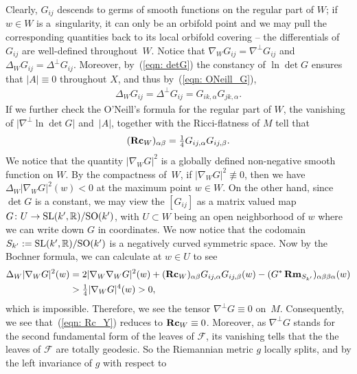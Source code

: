 \documentclass[pdftex]{sigma}
\numberwithin{equation}{section}
\newcommand{\Rm}{\operatorname{\bf Rm}}
\newcommand{\Rc}{\operatorname{\bf Rc}}
\begin{document}
Clearly, $G_{ij}$ descends to germs of smooth functions on the regular part of
$W$; if $w\in W$ is a~singularity, it can only be an orbifold point and we may
pull the corresponding quantities back to its local orbifold covering -- the
differentials of $G_{ij}$ are well-defined throughout~$W$. Notice that
$\nabla_W G_{ij}= \nabla^{\perp}G_{ij}$ and $\Delta_W G_{ij}=
\Delta^{\perp}G_{ij}$. Moreover, by~(\ref{eqn: detG}) the constancy of $\ln
\det G$ ensures that $|A|\equiv 0$ throughout $X$, and thus by~(\ref{eqn:
ONeill_G}),
\begin{align*}%
\Delta_W G_{ij} = \Delta^{\perp}G_{ij} = G_{ik,\alpha}G_{jk,\alpha}.
\end{align*}
If we further check the O'Neill's formula for the regular part of $W$, the
vanishing of $\big|\nabla^{\perp}\ln \det G\big|$ and~$|A|$, together with
the Ricci-flatness of $M$ tell that
\begin{align}\label{eqn: Rc_Y}
 (\Rc_W )_{\alpha\beta} = \tfrac{1}{4}G_{ij,\alpha}G_{ij,\beta}.
 \end{align}
We notice that the quantity $|\nabla_W G|^2$ is a globally defined non-negative
smooth function on $W$. By the compactness of~$W$, if
$\left|\nabla_W G\right|^2\not\equiv 0$, then we have $\Delta_W |\nabla_W
G |^2(w)<0$ at the maximum point $w\in W$. On the other hand, since $\det
G$ is a constant, we may view the $ [G_{ij} ]$ as a matrix valued map $G\colon
U \to {\rm SL}(k',\mathbb{R}) \slash {\rm SO}(k')$, with $U\subset W$ being an open
 neighborhood of $w$ where we can write down $G$ in coordinates. We now notice
 that the codomain $S_{k'}:={\rm SL}(k',\mathbb{R}) \slash {\rm SO}(k')$ is a negatively
 curved symmetric space. Now by the Bochner formula, we can calculate at $w\in
 U$ to see
 \begin{align*}
\Delta_W |\nabla_W G |^2(w)& =
2 |\nabla_W\nabla_W G |^2(w)+
 (\Rc_W )_{\alpha\beta}G_{ij,\alpha}G_{ij,\beta}(w)
- (G^{\ast}\Rm_{S_{k'}} )_{\alpha\beta\beta\alpha}(w)\\
 & >\tfrac{1}{4} |\nabla_W G |^4(w) > 0,
 \end{align*}
 which is impossible. Therefore, we see the tensor $\nabla^{\perp}G\equiv 0$
 on~$M$. Consequently, we see that~(\ref{eqn: Rc_Y}) reduces to
 $\Rc_W \equiv 0$. Moreover, as $\nabla^{\perp}G$ stands for the second
 fundamental form of the leaves of $\mathcal{F}$, its vanishing tells that the
 the leaves of $\mathcal{F}$ are totally geodesic. So the Riemannian
 metric $g$ locally splits, and by the left invariance of $g$ with respect to
\end{document}
